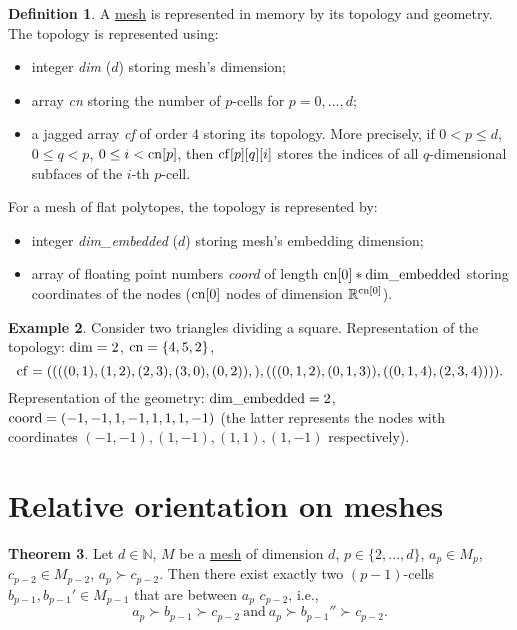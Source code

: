 \documentclass[fleqn]{article}
\theoremstyle{definition}
\newtheorem{theorem}{Theorem}[section]
\newtheorem{definition}[theorem]{Definition}
\newtheorem{example}[theorem]{Example}
\newcommand{\N}{\mathbb{N}}
\newcommand{\R}{\mathbb{R}}
\begin{document}
\begin{definition}
  A \hyperref[idec:mesh:definition]{mesh}
  is represented in memory by its topology and geometry.
  The topology is represented using:
  \begin{itemize}
    \item
      integer \emph{dim} ($d$) storing mesh's dimension;
    \item
      array \emph{cn} storing the number of $p$-cells for $p = 0, ..., d$;
    \item
      a jagged array \emph{cf} of order $4$ storing its topology.
      More precisely, if $0 < p \leq d$, $0 \leq q < p$,
      $0 \leq i < {\rm cn}[p]$, then ${\rm cf}[p][q][i]$ stores the indices of
      all $q$-dimensional subfaces of the $i$-th $p$-cell.
  \end{itemize}
  For a mesh of flat polytopes, the topology is represented by:
  \begin{itemize}
    \item
      integer \emph{dim\_embedded} ($d$) storing mesh's embedding dimension;
    \item
      array of floating point numbers \emph{coord} of length
      ${\rm cn}[0] * {\rm dim\_embedded}$ storing coordinates of the nodes
      (${\rm cn}[0]$ nodes of dimension $\R^{{\rm cn}[0]}$).
  \end{itemize}
\end{definition}

\begin{example}
  Consider two triangles dividing a square.
  Representation of the topology: ${\rm dim} = 2$, ${\rm cn} = \{4, 5, 2\}$,
  \begin{equation}
    {\rm cf} =
    (
      (
        ((0, 1), (1, 2), (2, 3), (3, 0), (0, 2)),
      ),
      (
        ((0, 1, 2), (0, 1, 3)),
        ((0, 1, 4), (2, 3, 4))
      )
    ).
  \end{equation}
  Representation of the geometry: ${\rm dim\_embedded} = 2$,
  ${\rm coord} = (-1, -1, 1, -1, 1, 1, 1, -1)$
  (the latter represents the nodes with coordinates
  $(-1, -1), (1, -1), (1, 1), (1, -1)$ respectively).
\end{example}

\section{Relative orientation on meshes}

\begin{theorem}
  Let
    $d \in \N$,
    $M$ be a \hyperref[idec:mesh:definition]{mesh} of dimension $d$,
    $p \in \{2, ..., d\}$,
    $a_p \in M_p$,
    $c_{p - 2} \in M_{p - 2}$,
    $a_p \succ c_{p - 2}$.
  Then there exist exactly two $(p - 1)$-cells
  $b_{p - 1}, b_{p - 1}' \in M_{p - 1}$
  that are between $a_p$ $c_{p - 2}$, i.e.,
  \begin{equation}
    a_p \succ b_{p - 1} \succ c_{p - 2}\ \text{and}\
    a_p \succ b_{p - 1}'' \succ c_{p - 2}.
  \end{equation}
\end{theorem}
\end{document}
